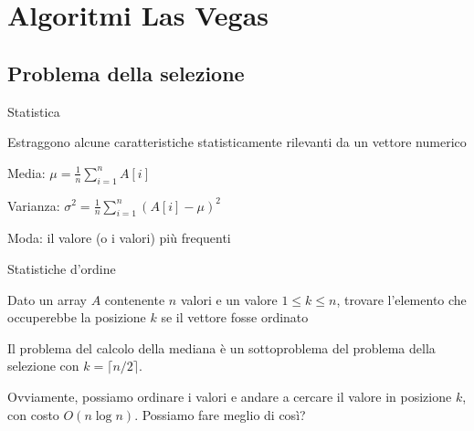 \section{Algoritmi Las Vegas}

\subsection{Problema della selezione}

\begin{frame}{Statistica}

\vspace{-9pt}
\begin{myboxtitle}
Estraggono alcune caratteristiche statisticamente rilevanti da un vettore numerico 
\end{myboxtitle}

\begin{myboxtitle}[Esempi]
\BIL
\item \alert{Media}: $\mu = \frac{1}{n} 	\sum_{i=1}^n A[i]$
\item \alert{Varianza}: $\sigma^2 = \frac{1}{n} \sum_{i=1}^n (A[i]- \mu)^2$
\item \alert{Moda}: il valore (o i valori) più frequenti
\EIL
\end{myboxtitle}
\end{frame}

\begin{frame}{Statistiche d'ordine}

\vspace{-9pt}
\begin{myboxtitle}[Selezione]
Dato un array $A$ contenente $n$ valori e un valore $1 \leq k \leq n$, 
trovare l'elemento che occuperebbe la posizione $k$ se il vettore fosse ordinato
\end{myboxtitle}

\begin{myboxtitle}[Mediana]
Il problema del calcolo della mediana è un sottoproblema del problema
della selezione con $k=\lceil n/2 \rceil$.
\end{myboxtitle}

\pause
Ovviamente, possiamo ordinare i valori e andare a cercare il valore in posizione $k$, con costo $O(n \log n)$. Possiamo fare meglio di così?

\end{frame}

